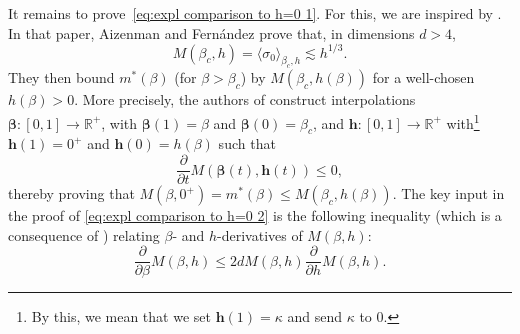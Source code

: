 \documentclass[10pt,a4paper]{amsart}
\numberwithin{equation}{section}
\begin{document}
It remains to prove~\eqref{eq:expl comparison to h=0 1}. For this, we are inspired by \cite{AizenmanFernandezCriticalBehaviorMagnetization1986}. In that paper, Aizenman and Fern\'andez prove that, in dimensions $d>4$,
\begin{equation}
	M(\beta_c,h)=\langle \sigma_0\rangle_{\beta_c,h}\lesssim h^{1/3}.
\end{equation}
They then bound $m^*(\beta)$ (for $\beta>\beta_c$) by $M(\beta_c,h(\beta))$ for a well-chosen $h(\beta)>0$. More precisely, the authors of \cite{AizenmanFernandezCriticalBehaviorMagnetization1986} construct interpolations $\boldsymbol{\beta}:[0,1]\rightarrow \mathbb R^+$, with $\boldsymbol{\beta}(1)=\beta$ and $\boldsymbol{\beta}(0)=\beta_c$, and $\boldsymbol{h}:[0,1]\rightarrow \mathbb R^+$ with\footnote{By this, we 
mean that we set $\boldsymbol{h}(1)=\kappa$ and send $\kappa$ to $0$.}  $\boldsymbol{h}(1)=0^+$ and $\boldsymbol{h}(0)=h(\beta)$ such that
\begin{equation}\label{eq:expl comparison to h=0 2}
	\frac{\partial}{\partial t}M(\boldsymbol{\beta}(t),\boldsymbol{h}(t))\leq 0,
\end{equation} 
thereby proving that 
$M(\beta,0^+)=m^*(\beta)\leq M(\beta_c,h(\beta))$. The key input in the proof of \eqref{eq:expl comparison to h=0 2} is the following inequality (which is a consequence of \cite{GriffithsHurstShermanConcavity1970}) relating $\beta$- and $h$-derivatives of $M(\beta,h)$:
\begin{equation}\label{eq:expl comparison to h=0 2.5}
	\frac{\partial}{\partial \beta}M(\beta,h)\leq 2d M(\beta,h)\frac{\partial}{\partial h}M(\beta,h).
\end{equation}
\end{document}
